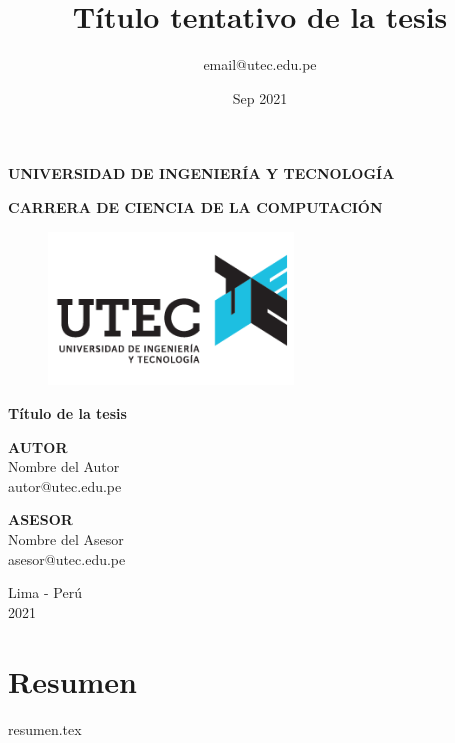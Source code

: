 \documentclass{report}
\title{Título tentativo de la tesis}
\author{email@utec.edu.pe}
\date{Sep 2021}
\begin{document}
\begin{titlepage}
    \begin{center}
        \Large
        \textbf{UNIVERSIDAD DE INGENIERÍA Y TECNOLOGÍA}
        \vspace*{1cm}

        \large
        \textbf{CARRERA DE CIENCIA DE LA COMPUTACIÓN}
        \vspace*{1cm}

        \begin{figure}[htbp]
            \centering
            \includegraphics[width=6.5cm,height=\textheight,keepaspectratio]{images/logo}
        \end{figure}


        \LARGE
        \textbf{Título de la tesis}

        \vspace{1.0cm}
        \Large


        \textbf{AUTOR}
        \vspace{0.5cm}
        \\Nombre del Autor
        \\autor@utec.edu.pe
        \vfill

        \vspace{1.0cm}

        \textbf{ASESOR}
        \vspace{0.5cm}
        \\Nombre del Asesor
        \\asesor@utec.edu.pe
        \vfill
        \vspace{0.8cm}
        \Large

        Lima - Perú
        \\
        2021

    \end{center}
\end{titlepage}


\chapter*{Resumen}
{resumen.tex}
\end{document}
